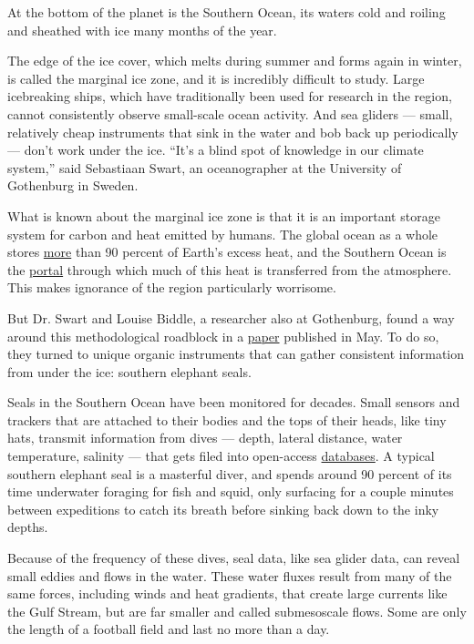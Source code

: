 At the bottom of the planet is the Southern Ocean, its waters cold and
roiling and sheathed with ice many months of the year.

The edge of the ice cover, which melts during summer and forms again in
winter, is called the marginal ice zone, and it is incredibly difficult
to study. Large icebreaking ships, which have traditionally been used
for research in the region, cannot consistently observe small-scale
ocean activity. And sea gliders --- small, relatively cheap instruments
that sink in the water and bob back up periodically --- don't work under
the ice. ``It's a blind spot of knowledge in our climate system,'' said
Sebastiaan Swart, an oceanographer at the University of Gothenburg in
Sweden.

What is known about the marginal ice zone is that it is an important
storage system for carbon and heat emitted by humans. The global ocean
as a whole stores
\href{https://www.ipcc.ch/site/assets/uploads/2018/02/WG1AR5_Chapter03_FINAL.pdf}{more}
than 90 percent of Earth's excess heat, and the Southern Ocean is the
\href{https://journals.ametsoc.org/jcli/article/31/12/4727/94167/Southern-Ocean-Heat-Uptake-Redistribution-and}{portal}
through which much of this heat is transferred from the atmosphere. This
makes ignorance of the region particularly worrisome.

But Dr. Swart and Louise Biddle, a researcher also at Gothenburg, found
a way around this methodological roadblock in a
\href{https://agupubs.onlinelibrary.wiley.com/doi/full/10.1029/2019JC015587}{paper}
published in May. To do so, they turned to unique organic instruments
that can gather consistent information from under the ice: southern
elephant seals.

Seals in the Southern Ocean have been monitored for decades. Small
sensors and trackers that are attached to their bodies and the tops of
their heads, like tiny hats, transmit information from dives --- depth,
lateral distance, water temperature, salinity --- that gets filed into
open-access \href{http://www.meop.net/database/}{databases}. A typical
southern elephant seal is a masterful diver, and spends around 90
percent of its time underwater foraging for fish and squid, only
surfacing for a couple minutes between expeditions to catch its breath
before sinking back down to the inky depths.

Because of the frequency of these dives, seal data, like sea glider
data, can reveal small eddies and flows in the water. These water fluxes
result from many of the same forces, including winds and heat gradients,
that create large currents like the Gulf Stream, but are far smaller and
called submesoscale flows. Some are only the length of a football field
and last no more than a day.

